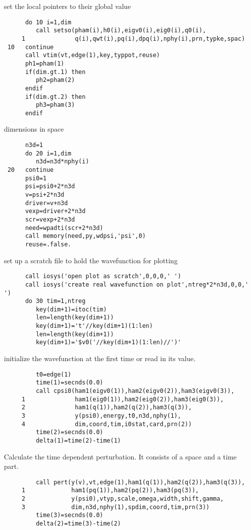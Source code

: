 \documentclass{article}
\begin{document}
     set the local pointers to their global value

\begin{verbatim}
      do 10 i=1,dim
         call setso(pham(i),h0(i),eigv0(i),eig0(i),q0(i),
     1              q(i),qwt(i),pq(i),dpq(i),nphy(i),prn,typke,spac)
 10   continue
      call vtim(vt,edge(1),key,typpot,reuse)
      ph1=pham(1)
      if(dim.gt.1) then
         ph2=pham(2)
      endif
      if(dim.gt.2) then
         ph3=pham(3)
      endif
\end{verbatim}
      dimensions in space
\begin{verbatim}
      n3d=1
      do 20 i=1,dim
         n3d=n3d*nphy(i)
 20   continue
      psi0=1 
      psi=psi0+2*n3d
      v=psi+2*n3d
      driver=v+n3d
      vexp=driver+2*n3d
      scr=vexp+2*n3d
      need=wpadti(scr+2*n3d)
      call memory(need,py,wdpsi,'psi',0)
      reuse=.false.
\end{verbatim}
     set up a scratch file to hold the wavefunction for plotting
\begin{verbatim}
      call iosys('open plot as scratch',0,0,0,' ')
      call iosys('create real wavefunction on plot',ntreg*2*n3d,0,0,' ') 
      do 30 tim=1,ntreg
         key(dim+1)=itoc(tim)
         len=length(key(dim+1))
         key(dim+1)='t'//key(dim+1)(1:len)
         len=length(key(dim+1))
         key(dim+1)='$v0('//key(dim+1)(1:len)//')'  
\end{verbatim}
     initialize the wavefunction at the first time or read in its value.
\begin{verbatim}
         t0=edge(1)
         time(1)=secnds(0.0)
         call cpsi0(ham1(eigv0(1)),ham2(eigv0(2)),ham3(eigv0(3)),
     1              ham1(eig0(1)),ham2(eig0(2)),ham3(eig0(3)),
     2              ham1(q(1)),ham2(q(2)),ham3(q(3)),
     3              y(psi0),energy,t0,n3d,nphy(1),
     4              dim,coord,tim,i0stat,card,prn(2))
         time(2)=secnds(0.0)
         delta(1)=time(2)-time(1)
\end{verbatim}
        Calculate the time dependent perturbation.  It consists of a  
        space and a time part.                                        
\begin{verbatim}
         call pert(y(v),vt,edge(1),ham1(q(1)),ham2(q(2)),ham3(q(3)),
     1             ham1(pq(1)),ham2(pq(2)),ham3(pq(3)),
     2             y(psi0),vtyp,scale,omega,width,shift,gamma,
     3             dim,n3d,nphy(1),spdim,coord,tim,prn(3))
         time(3)=secnds(0.0)
         delta(2)=time(3)-time(2)
\end{verbatim}
\end{document}

